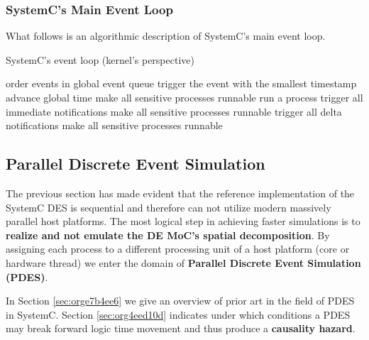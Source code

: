 \documentclass[11pt]{article}
\begin{document}
\subsubsection{SystemC's Main Event Loop}
\label{sec:orgb4de4ad}
What follows is an algorithmic description of SystemC's main event loop.
\begin{algorithm}
\caption{SystemC's event loop (kernel's perspective)}
\label{alg:kernel}
\begin{algorithmic}[1]

             
      \State order events in global event queue
      \State trigger the event with the smallest timestamp
      \State advance global time
      \State make all sensitive processes runnable
          
	     \State run a process
             \State trigger all immediate notifications
             \State make all sensitive processes runnable
         \EndWhile
	 \State trigger all delta notifications
         \State make all sensitive processes runnable
       \EndWhile
   \EndWhile

\end{algorithmic}
\end{algorithm}



\clearpage

\subsection{Parallel Discrete Event Simulation}
\label{sec:org007a7c5}
The previous section has made evident that the reference implementation of the SystemC DES is sequential and therefore can not utilize modern massively parallel host platforms. 
The most logical step in achieving faster simulations is to \textbf{realize and not emulate the DE MoC's spatial decomposition}.
By assigning each process to a different processing unit of a host platform (core or hardware thread) we enter the domain of \textbf{Parallel Discrete Event Simulation (PDES)}.

In Section \ref{sec:orge7b4ee6} we give an overview of prior art in the field of PDES in SystemC.
Section \ref{sec:org4eed10d} indicates under which conditions a PDES may break forward logic time movement and thus produce a \textbf{causality hazard}.
\end{document}
